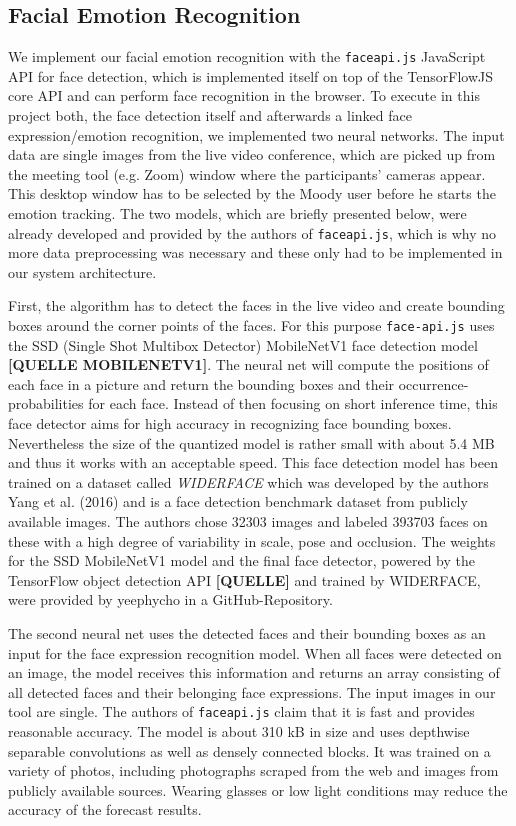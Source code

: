 \subsection{Facial Emotion Recognition}
\label{subsec:method_facial_emotion_recognition}
We implement our facial emotion recognition with the \texttt{faceapi.js} JavaScript API for face detection, which is implemented itself on top of the TensorFlowJS core API and can perform face recognition in the browser. To execute in this project both, the face detection itself and afterwards a linked face expression/emotion recognition, we implemented two neural networks. The input data are single images from the live video conference, which are picked up from the meeting tool (e.g. Zoom) window where the participants' cameras appear. This desktop window has to be selected by the Moody user before he starts the emotion tracking. The two models, which are briefly presented below, were already developed and provided by the authors of \texttt{faceapi.js}, which is why no more data preprocessing was necessary and these only had to be implemented in our system architecture.

First, the algorithm has to detect the faces in the live video and create bounding boxes around the corner points of the faces. For this purpose \texttt{face-api.js} uses the SSD (Single Shot Multibox Detector) MobileNetV1 face detection model \textbf{[QUELLE MOBILENETV1]}. The neural net will compute the positions of each face in a picture and return the bounding boxes and their occurrence-probabilities for each face. Instead of then focusing on short inference time, this face detector aims for high accuracy in recognizing face bounding boxes. Nevertheless the size of the quantized model is rather small with about 5.4 MB and thus it works with an acceptable speed. This face detection model has been trained on a dataset called 
\emph{WIDERFACE} which was developed by the authors Yang et al. (2016) and is a face detection benchmark dataset from publicly available images. The authors chose 32303 images and labeled 393703 faces on these with a high degree of variability in scale, pose and occlusion. The weights for the SSD MobileNetV1 model and the final face detector, powered by the TensorFlow object detection API \textbf{[QUELLE]} and trained by WIDERFACE, were provided by yeephycho in a GitHub-Repository.

The second neural net uses the detected faces and their bounding boxes as an input for the face expression recognition model. When all faces were detected on an image, the model receives this information and returns an array consisting of all detected faces and their belonging face expressions. The input images in our tool are single. The authors of \texttt{faceapi.js} claim that it is fast and provides reasonable accuracy. The model is about 310 kB in size and uses depthwise separable convolutions as well as densely connected blocks. It was trained on a variety of photos, including photographs scraped from the web and images from publicly available sources. Wearing glasses or low light conditions may reduce the accuracy of the forecast results.


